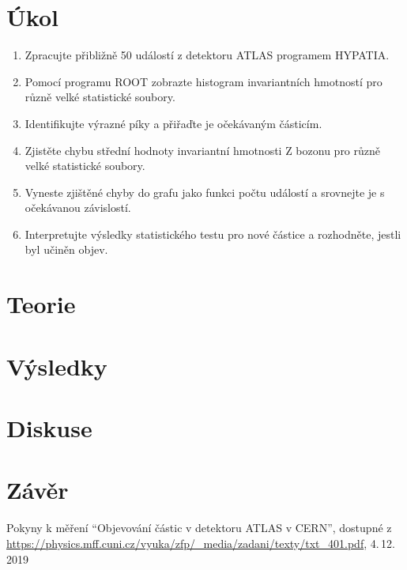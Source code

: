 \documentclass{scirep}
\begin{document}
    \section*{Úkol}

    \begin{enumerate}

        \item Zpracujte přibližně 50 událostí z detektoru ATLAS programem HYPATIA.
        \item Pomocí programu ROOT zobrazte histogram invariantních hmotností pro různě velké statistické soubory.
        \item Identifikujte výrazné píky a přiřaďte je očekávaným částicím.
        \item Zjistěte chybu střední hodnoty invariantní hmotnosti Z bozonu pro různě velké statistické soubory.
        \item Vyneste zjištěné chyby do grafu jako funkci počtu událostí a srovnejte je s očekávanou závislostí.
        \item Interpretujte výsledky statistického testu pro nové částice a rozhodněte, jestli byl učiněn objev.

    \end{enumerate}

    \section*{Teorie}


    \section*{Výsledky}

    \section*{Diskuse}

    \section*{Závěr}

    \begin{thebibliography}{}

        Pokyny k měření ``Objevování částic v detektoru ATLAS v CERN'', dostupné z\\ \url{https://physics.mff.cuni.cz/vyuka/zfp/_media/zadani/texty/txt_401.pdf}, 4.\,12.\,2019

    \end{thebibliography}
\end{document}
